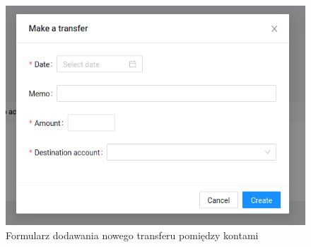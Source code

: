 \documentclass[shortabstract,inz]{iithesis}
\begin{document}
\begin{figure}
	\centering
	\includegraphics[scale=0.7]{screen-make-transfer.png}
	\caption{Formularz dodawania nowego transferu pomiędzy kontami}
	\label{fig:screen-make-transfer}
\end{figure}
\end{document}
